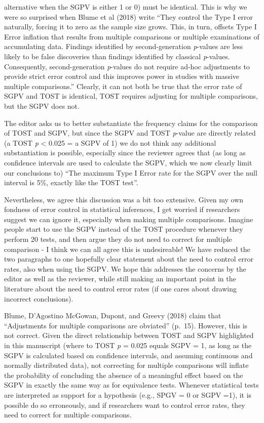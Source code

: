 \documentclass[man]{apa6}
\begin{document}
\begin{enumerate}
  alternative when the SGPV is either 1 or 0) must be identical. This is
  why we were so surprised when Blume et al (2018) write \enquote{They
  control the Type I error naturally, forcing it to zero as the sample
  size grows. This, in turn, offsets Type I Error inflation that results
  from multiple comparisons or multiple examinations of accumulating
  data. Findings identified by second-generation \emph{p}-values are
  less likely to be false discoveries than findings identified by
  classical \emph{p}-values. Consequently, second-generation
  \emph{p}-values do not require ad-hoc adjustments to provide strict
  error control and this improves power in studies with massive multiple
  comparisons.} Clearly, it can not both be true that the error rate of
  SGPV and TOST is identical, TOST requires adjusting for multiple
  comparisons, but the SGPV does not.
\end{enumerate}

The editor asks us to better substantiate the frequency claims for the
comparison of TOST and SGPV, but since the SGPV and TOST \emph{p}-value
are directly related (a TOST \emph{p} \textless{} 0.025 = a SGPV of 1)
we do not think any additional substantiation is possible, especially
since the reviewer agrees that (as long as confidence intervals are used
to calculate the SGPV, which we now clearly limit our conclusions to)
\enquote{The maximum Type I Error rate for the SGPV over the null
interval is 5\%, exactly like the TOST test}.

Nevertheless, we agree this discussion was a bit too extensive. Given my
own fondness of error control in statistical inferences, I get worried
if researchers suggest we can ignore it, especially when making multiple
comparisons. Imagine people start to use the SGPV instead of the TOST
procedure whenever they perform 20 tests, and then argue they do not
need to correct for multiple comparison - I think we can all agree this
is undesireable! We have reduced the two paragraphs to one hopefully
clear statement about the need to control error rates, also when using
the SGPV. We hope this addresses the concerns by the editor as well as
the reviewer, while still making an important point in the literature
about the need to control error rates (if one cares about drawing
incorrect conclusions).

Blume, D'Agostino McGowan, Dupont, and Greevy (2018) claim that
\enquote{Adjustments for multiple comparisons are obviated} (p.~15).
However, this is not correct. Given the direct relationship between TOST
and SGPV highlighted in this manuscript (where to TOST \emph{p} = 0.025
equals SGPV = 1, as long as the SGPV is calculated based on confidence
intervals, and assuming continuous and normally distributed data), not
correcting for multiple comparisons will inflate the probability of
concluding the absence of a meaningful effect based on the SGPV in
exactly the same way as for equivalence tests. Whenever statistical
tests are interpreted as support for a hypothesis (e.g., SPGV = 0 or
SGPV =1), it is possible do so erroneously, and if researchers want to
control error rates, they need to correct for multiple comparisons.
\end{document}
